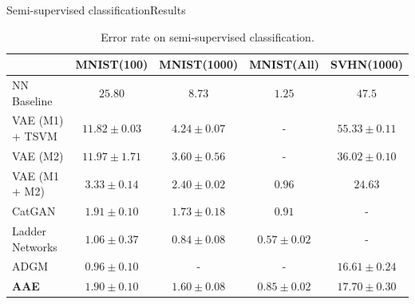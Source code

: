 \documentclass[10pt]{beamer}
\begin{document}
\begin{frame}{Semi-supervised classification}{Results}
\begin{table}
  \centering
  \scriptsize
    \begin{tabular}{l||c|c|c||c}
    	\toprule
    	                &     MNIST(100)     &    MNIST(1000)    &    MNIST(All)     &     SVHN(1000)     \\ \midrule
    	NN Baseline     &     $ 25.80 $      &     $ 8.73 $      &     $ 1.25 $      &      $ 47.5 $      \\ \midrule
    	VAE (M1) + TSVM & $ 11.82 \pm 0.03 $ & $ 4.24 \pm 0.07 $ &         -         & $ 55.33 \pm 0.11 $ \\
    	VAE (M2)        & $ 11.97 \pm 1.71 $ & $ 3.60 \pm 0.56 $ &         -         & $ 36.02 \pm 0.10 $ \\
    	VAE (M1 + M2)   & $ 3.33 \pm 0.14 $  & $ 2.40 \pm 0.02 $ &     $ 0.96 $      &     $ 24.63 $      \\
    	CatGAN          & $ 1.91 \pm 0.10 $  & $ 1.73 \pm 0.18 $ &     $ 0.91 $      &         -          \\
    	Ladder Networks & $ 1.06 \pm 0.37 $  & $ 0.84 \pm 0.08 $ & $ 0.57 \pm 0.02 $ &         -          \\
    	ADGM            & $ 0.96 \pm 0.10 $  &         -         &         -         & $ 16.61 \pm 0.24 $ \\ \midrule
    	\textbf{AAE}    & $ 1.90 \pm 0.10 $  & $ 1.60 \pm 0.08 $ & $ 0.85 \pm 0.02 $ & $ 17.70 \pm 0.30 $ \\ \bottomrule
    \end{tabular}
  \caption{Error rate on semi-supervised classification.}
\end{table}
\end{frame}
\end{document}
